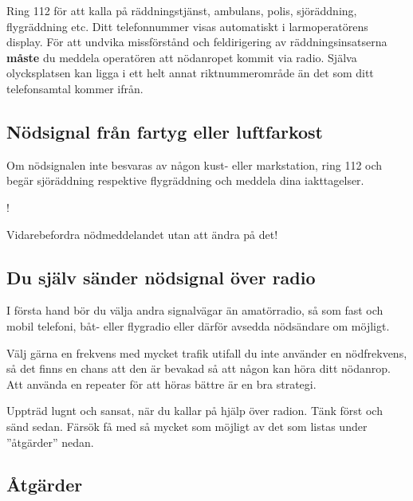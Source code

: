 Ring 112 för att kalla på räddningstjänst, ambulans, polis, sjöräddning,
flygräddning etc.               %
Ditt telefonnummer visas automatiskt i larmoperatörens display.
För att undvika missförstånd och feldirigering av räddningsinsatserna
\textbf{måste} du meddela operatören att nödanropet kommit via radio.
Själva olycksplatsen kan ligga i ett helt annat riktnummerområde än det som ditt
telefonsamtal kommer ifrån.

\subsection{Nödsignal från fartyg eller luftfarkost}
\label{nödsignal fartyg}

Om nödsignalen inte besvaras av någon kust- eller markstation, ring 112
och begär sjöräddning respektive flygräddning och meddela dina iakttagelser.

\begin{center}
\begin{minipage}{0.19\columnwidth}
\Huge{\Huge{\hspace{1ex}!}}
\end{minipage}
\begin{minipage}{0.7\columnwidth}
Vidarebefordra nödmeddelandet utan att ändra på det!
\end{minipage}
\end{center}

\subsection{Du själv sänder nödsignal över radio}
\label{nödtrafik egen}

I första hand bör du välja andra signalvägar än amatörradio, så som fast och
mobil telefoni, båt- eller flygradio eller därför avsedda nödsändare om möjligt.

Välj gärna en frekvens med mycket trafik utifall du inte använder en
nödfrekvens, så det finns en chans att den är bevakad så att någon kan höra
ditt nödanrop.
Att använda en repeater för att höras bättre är en bra strategi.

Uppträd lugnt och sansat, när du kallar på hjälp över radion.
Tänk först och sänd sedan. Färsök få med så mycket som möjligt av det som listas
under ''åtgärder'' nedan.

\newpage %
\subsection{Åtgärder}


